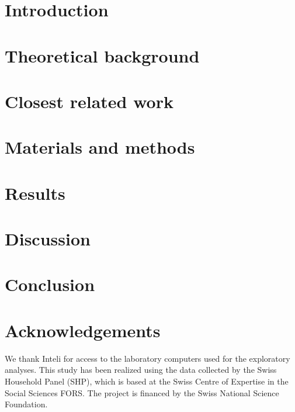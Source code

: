 \documentclass[pdflatex,sn-mathphys-num,iicol]{sn-jnl}
\begin{document}
\section{Introduction}


\section{Theoretical background}


\section{Closest related work}\label{sec:related}


\section{Materials and methods}





\section{Results}


\section{Discussion}


\section{Conclusion}


\section*{Acknowledgements}
We thank Inteli for access to the laboratory computers used for the exploratory analyses. This study has been realized using the data collected by the Swiss Household Panel (SHP), which is based at the Swiss Centre of Expertise in the Social Sciences FORS. The project is financed by the Swiss National Science Foundation.
\end{document}
